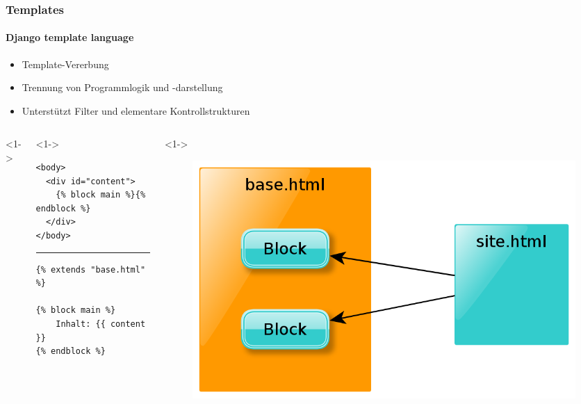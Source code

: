 \documentclass[
    t,
    smaller,
    compress,
    xcolor=svgnames,            %
    table,
]{beamer}
\begin{document}
\begin{frame}[fragile]
    \frametitle{Templates}
    \framesubtitle{Django template language}
    \vspace{-8pt}
     \begin{itemize}[<1->]
        \item Template-Vererbung
        \item Trennung von Programmlogik und -darstellung
        \item Unterstützt Filter und elementare Kontrollstrukturen
     \end{itemize}

\vspace{-12pt}
\begin{columns}<1->
    \begin{column}{.55\textwidth}<1->
\begin{lstlisting}[title=base.html]
<body>
  <div id="content">
    {% block main %}{% endblock %}
  </div>
</body>
\end{lstlisting}
\hrule
\begin{lstlisting}[title=site.html]
{% extends "base.html" %}

{% block main %}
    Inhalt: {{ content }}
{% endblock %}
\end{lstlisting}

    \end{column}

    \begin{column}{.45\textwidth}<1->
    \vspace{12pt}
     \begin{figure}
        \includegraphics[width=\textwidth] {template.png}
      \end{figure}
    \end{column}
\end{columns}

\end{frame}
\end{document}

